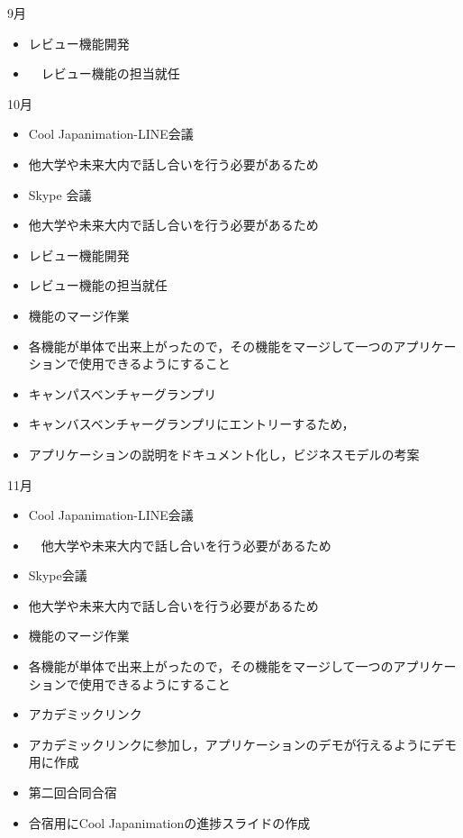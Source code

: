 9月
\begin{itemize}
\item レビュー機能開発
\item 　レビュー機能の担当就任
\end{itemize}
10月
\begin{itemize}
\item Cool Japanimation-LINE会議
\item   他大学や未来大内で話し合いを行う必要があるため
\item Skype 会議
\item 他大学や未来大内で話し合いを行う必要があるため
\item レビュー機能開発
\item   レビュー機能の担当就任
\item 機能のマージ作業
\item   各機能が単体で出来上がったので，その機能をマージして一つのアプリケーションで使用できるようにすること
\item キャンパスベンチャーグランプリ
\item   キャンバスベンチャーグランプリにエントリーするため，
\item   アプリケーションの説明をドキュメント化し，ビジネスモデルの考案
\end{itemize}
11月
\begin{itemize}
\item Cool Japanimation-LINE会議
\item 　他大学や未来大内で話し合いを行う必要があるため
\item Skype会議
\item   他大学や未来大内で話し合いを行う必要があるため
\item 機能のマージ作業
\item   各機能が単体で出来上がったので，その機能をマージして一つのアプリケーションで使用できるようにすること
\item アカデミックリンク
\item   アカデミックリンクに参加し，アプリケーションのデモが行えるようにデモ用に作成
\item 第二回合同合宿
\item   合宿用にCool Japanimationの進捗スライドの作成
\end{itemize}

